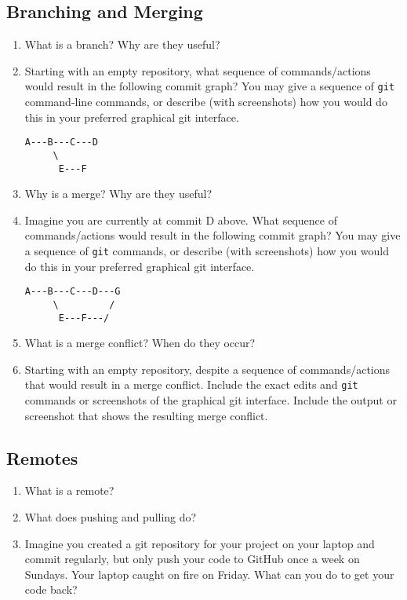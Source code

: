 \documentclass[10pt,twocolumn]{article}
\begin{document}
\subsection{Branching and Merging}

\begin{enumerate}
\item What is a branch? Why are they useful?
\item Starting with an empty repository, what sequence of commands/actions would result in the following commit graph? You may give a sequence of \texttt{git} command-line commands, or describe (with screenshots) how you would do this in your preferred graphical git interface.
\begin{verbatim}
A---B---C---D
     \
      E---F
\end{verbatim}
\item Why is a merge? Why are they useful?
\item Imagine you are currently at commit D above. What sequence of commands/actions would result in the following commit graph? You may give a sequence of \texttt{git} commands, or describe (with screenshots) how you would do this in your preferred graphical git interface.
\begin{verbatim}
A---B---C---D---G
     \         /
      E---F---/
\end{verbatim}
\item What is a merge conflict? When do they occur?
\item Starting with an empty repository, despite a sequence of commands/actions that would result in a merge conflict. Include the exact edits and \texttt{git} commands or screenshots of the graphical git interface. Include the output or screenshot that shows the resulting merge conflict.
\end{enumerate}

\subsection{Remotes}

\begin{enumerate}
\item What is a remote?
\item What does pushing and pulling do?
\item Imagine you created a git repository for your project on your laptop and commit regularly, but only push your code to GitHub once a week on Sundays. Your laptop caught on fire on Friday. What can you do to get your code back?
\end{enumerate}
\end{document}
